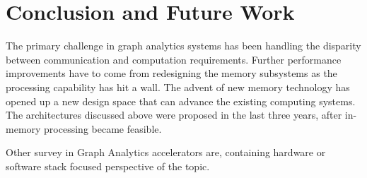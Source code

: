 \section{Conclusion and Future Work}

The primary challenge in graph analytics systems has been handling the disparity between communication and computation requirements. Further performance improvements have to come from redesigning the memory subsystems as the processing capability has hit a wall. The advent of new memory technology has opened up a new design space that can advance the existing computing systems. The architectures discussed above were proposed in the last three years, after in-memory processing became feasible.

Other survey in Graph Analytics accelerators are\cite{BGA-book, SG-MT}, containing hardware or software stack focused perspective of the topic.

